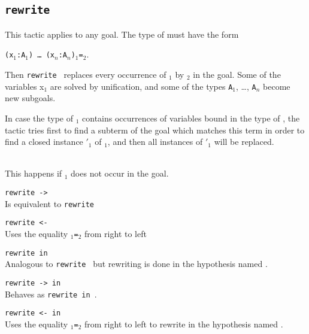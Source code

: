 \subsection{\tt rewrite \term}
\label{rewrite}
This tactic applies to any goal. The type of {\term}
must have the form

\texttt{(x$_1$:A$_1$) \dots\ (x$_n$:A$_n$)}\term$_1${\tt =}\term$_2$. 

\noindent Then {\tt rewrite \term} replaces every occurrence of 
\term$_1$ by \term$_2$ in the goal. Some of the variables x$_1$ are
solved by unification, and some of the types \texttt{A}$_1$, \dots,
\texttt{A}$_n$ become new subgoals.

\Rem In case the type of  
\term$_1$ contains occurrences of variables bound in the
type of \term, the tactic tries first to find a subterm of the goal
which matches this term in order to find a closed instance \term$'_1$
of \term$_1$, and then all instances of \term$'_1$ will be replaced.

\begin{ErrMsgs}
\item {}

\item {}\\
This happens if \term$_1$ does not occur in the goal.
\end{ErrMsgs}

\begin{Variants}
\item {\tt rewrite -> {\term}}\\
  Is equivalent to {\tt rewrite \term}

\item {\tt rewrite <- {\term}}\\
  Uses the equality \term$_1${\tt=}\term$_2$ from right to left

\item {\tt rewrite {\term} in {\ident}}
  \\
  Analogous to  {\tt rewrite {\term}} but rewriting is done in the
  hypothesis named {\ident}.

\item {\tt rewrite -> {\term} in {\ident}}
  \\
  Behaves as {\tt rewrite {\term} in {\ident}}.
 
\item {\tt rewrite <- {\term} in {\ident}}\\
  Uses the equality \term$_1${\tt=}\term$_2$ from right to left to
  rewrite in the hypothesis named {\ident}.
\end{Variants}


